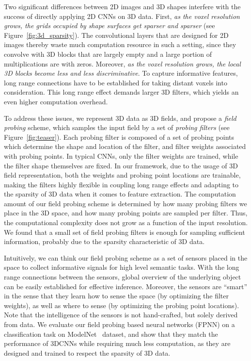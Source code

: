 Two significant differences between 2D images and 3D shapes interfere with the success of directly applying 2D CNNs on 3D data. First, \emph{as the voxel resolution grows, the grids occupied by shape surfaces get sparser and sparser} (see Figure~\ref{fig:3d_sparsity}). The convolutional layers that are designed for 2D images thereby waste much computation resource in such a setting, since they convolve with 3D blocks that are largely empty and a large portion of multiplications are with zeros. Moreover, \emph{as the voxel resolution grows, the local 3D blocks become less and less discriminative}. To capture informative features, long range connections have to be established for taking distant voxels into consideration. This long range effect demands larger 3D filters, which yields an even higher computation overhead.

To address these issues, we represent 3D data as 3D fields, and propose a \emph{field probing} scheme, which samples the input field by a set of {\em probing filters} (see Figure~\ref{fig:teaser}). Each probing filter is composed of a set of probing points which determine the shape and location of the filter, and filter weights associated with probing points. In typical CNNs, only the filter weights are trained, while the filter shape themselves are fixed. In our framework, due to the usage of 3D field representation, both the weights and probing point locations are trainable, making the filters highly flexible in coupling long range effects and adapting to the sparsity of 3D data when it comes to feature extraction. The computation amount of our field probing scheme is determined by how many probing filters we place in the 3D space, and how many probing points are sampled per filter. Thus, the computational complexity does not grow as a function of the input resolution. We found that a small set of field probing filters is enough for sampling sufficient information, probably due to the sparsity characteristic of 3D data.

Intuitively, we can think our field probing scheme as a set of sensors placed in the space to collect informative signals for high level semantic tasks. With the long range connections between the sensors, global overview of the underlying object can be easily established for effective inference. Moreover, the sensors are ``smart'' in the sense that they learn how to sense the space (by optimizing the filter weights), as well as where to sense (by optimizing the probing point locations). Note that the intelligence of the sensors is not hand-crafted, but solely derived from data. We evaluate our field probing based neural networks (FPNN) on a classification task on ModelNet~\cite{WU_CVPR15_3D} dataset, and show that they match the performance of 3DCNNs while requiring much less computation, as they are designed and trained to respect the sparsity of 3D data.
